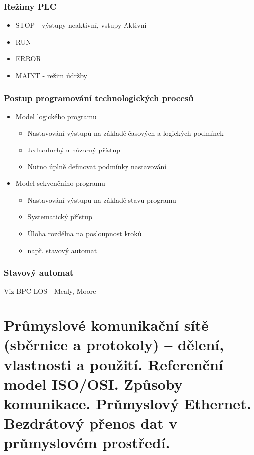 \subsubsection*{Režimy PLC}
\begin{itemize}
  \item STOP - výstupy neaktivní, vstupy Aktivní
  \item RUN 
  \item ERROR 
  \item MAINT - režim údržby
\end{itemize}

\subsubsection*{Postup programování technologických procesů}
\begin{itemize}
  \item Model logického programu \begin{itemize}
    \item Nastavování výstupů na základě časových a logických podmínek
    \item Jednoduchý a názorný přístup
    \item Nutno úplně definovat podmínky nastavování
  \end{itemize}
  \item Model sekvenčního programu \begin{itemize}
    \item Nastavování výstupu na základě stavu programu
    \item Systematický přístup
    \item Úloha rozdělna na posloupnost kroků
    \item např. stavový automat
  \end{itemize}
\end{itemize}

\subsubsection*{Stavový automat}
Viz BPC-LOS - Mealy, Moore

\section{Průmyslové komunikační sítě (sběrnice a protokoly) – dělení, vlastnosti a použití. Referenční model ISO/OSI. Způsoby komunikace. Průmyslový Ethernet. Bezdrátový přenos dat v průmyslovém prostředí.}
